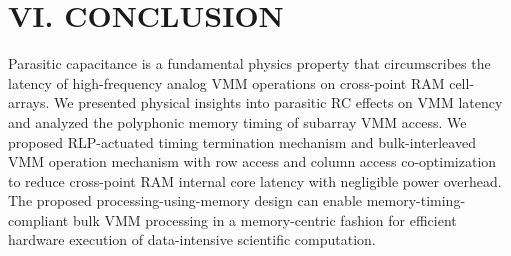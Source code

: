 \documentclass{article}
\begin{document}
	\section*{VI. CONCLUSION}
		Parasitic capacitance is a fundamental physics property that
		circumscribes the latency of high-frequency analog VMM
		operations on cross-point RAM cell-arrays. We presented
		physical insights into parasitic RC effects on VMM latency and analyzed the polyphonic memory timing of subarray
		VMM access. We proposed RLP-actuated timing termination
		mechanism and bulk-interleaved VMM operation mechanism
		with row access and column access co-optimization to reduce
		cross-point RAM internal core latency with negligible power
		overhead. The proposed processing-using-memory design can
		enable memory-timing-compliant bulk VMM processing in a
		memory-centric fashion for efficient hardware execution of
		data-intensive scientific computation.
	
	
	
 
\end{document}
